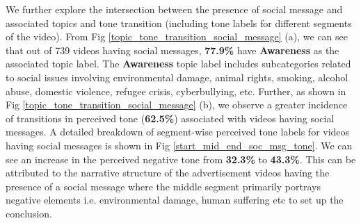 We further explore the intersection between the presence of social message and associated topics and tone transition (including tone labels for different segments of the video). From Fig \ref{topic_tone_transition_social_message} (a), we can see that out of 739 videos having social messages, \textbf{77.9\%} have \textbf{Awareness} as the associated topic label. The \textbf{Awareness} topic label includes subcategories related to social issues involving environmental damage, animal rights, smoking, alcohol abuse, domestic violence, refugee crisis, cyberbullying, etc. Further, as shown in Fig \ref{topic_tone_transition_social_message} (b), we observe a greater incidence of transitions in perceived tone (\textbf{62.5\%}) associated with videos having social messages. A detailed breakdown of segment-wise perceived tone labels for videos having social messages is shown in Fig \ref{start_mid_end_soc_msg_tone}. We can see an increase in the perceived negative tone from \textbf{32.3\%} to \textbf{43.3\%}. This can be attributed to the narrative structure of the advertisement videos having the presence of a social message where the middle segment primarily portrays negative elements i.e. environmental damage, human suffering etc to set up the conclusion.
